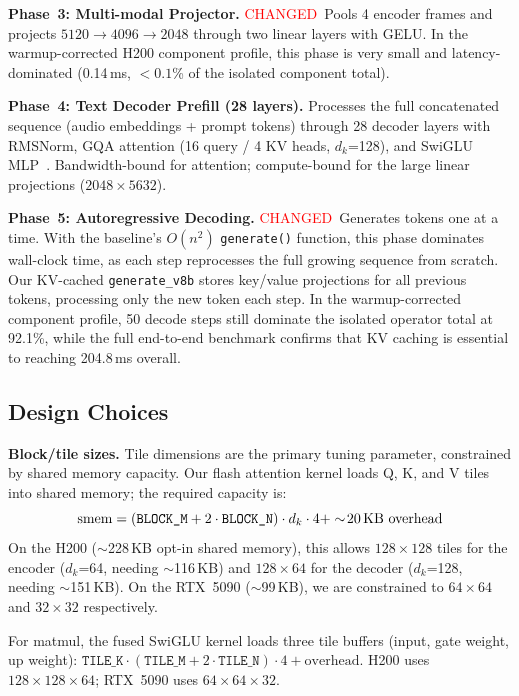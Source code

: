 \documentclass{article}
\newcommand{\chg}[1]{{\color{blue}#1}}
\newcommand{\chglabel}{{\setlength{\fboxsep}{1pt}\colorbox{yellow!45}{\textcolor{red}{\scriptsize CHANGED}}}}
\begin{document}
\textbf{Phase~3: Multi-modal Projector.}
\chglabel\ \chg{Pools 4 encoder frames and projects $5120 \to 4096 \to 2048$ through two linear layers with GELU.  In the warmup-corrected H200 component profile, this phase is very small and latency-dominated (0.14\,ms, $<0.1$\% of the isolated component total).}

\textbf{Phase~4: Text Decoder Prefill (28 layers).}
Processes the full concatenated sequence (audio embeddings + prompt tokens) through 28 decoder layers with RMSNorm, GQA attention (16 query / 4 KV heads, $d_k$=128), and SwiGLU MLP~\citep{shazeer2020glu}.  Bandwidth-bound for attention; compute-bound for the large linear projections ($2048 \times 5632$).

\textbf{Phase~5: Autoregressive Decoding.}
\chglabel\ \chg{Generates tokens one at a time.  With the baseline's $O(n^2)$ \texttt{generate()} function, this phase dominates wall-clock time, as each step reprocesses the full growing sequence from scratch.  Our KV-cached \texttt{generate\_v8b} stores key/value projections for all previous tokens, processing only the new token each step.  In the warmup-corrected component profile, 50 decode steps still dominate the isolated operator total at 92.1\%, while the full end-to-end benchmark confirms that KV caching is essential to reaching 204.8\,ms overall.}

\subsection{Design Choices}

\textbf{Block/tile sizes.}
Tile dimensions are the primary tuning parameter, constrained by shared memory capacity.  Our flash attention kernel loads Q, K, and V tiles into shared memory; the required capacity is:
\begin{equation}
\text{smem} = (\texttt{BLOCK\_M} + 2 \cdot \texttt{BLOCK\_N}) \cdot d_k \cdot 4 + \sim\!20\text{\,KB overhead}
\label{eq:smem}
\end{equation}
On the H200 ($\sim$228\,KB opt-in shared memory), this allows $128 \times 128$ tiles for the encoder ($d_k$=64, needing $\sim$116\,KB) and $128 \times 64$ for the decoder ($d_k$=128, needing $\sim$151\,KB).  On the RTX~5090 ($\sim$99\,KB), we are constrained to $64 \times 64$ and $32 \times 32$ respectively.

For matmul, the fused SwiGLU kernel loads three tile buffers (input, gate weight, up weight): $\texttt{TILE\_K} \cdot (\texttt{TILE\_M} + 2 \cdot \texttt{TILE\_N}) \cdot 4 + \text{overhead}$.  H200 uses $128 \times 128 \times 64$; RTX~5090 uses $64 \times 64 \times 32$.
\end{document}
